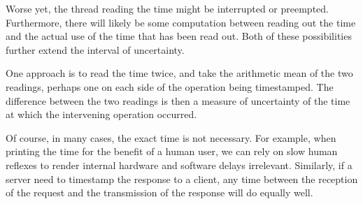 Worse yet, the thread reading the time might be interrupted or preempted.
Furthermore, there will likely be some computation between reading out
the time and the actual use of the time that has been read out.
Both of these possibilities further extend the interval of uncertainty.

One approach is to read the time twice, and take the arithmetic mean
of the two readings, perhaps one on each side of the operation being
timestamped.
The difference between the two readings is then a measure of uncertainty
of the time at which the intervening operation occurred.

Of course, in many cases, the exact time is not necessary.
For example, when printing the time for the benefit of a human user,
we can rely on slow human reflexes to render internal hardware and
software delays irrelevant.
Similarly, if a server need to timestamp the response to a client, any
time between the reception of the request and the transmission of the
response will do equally well.






